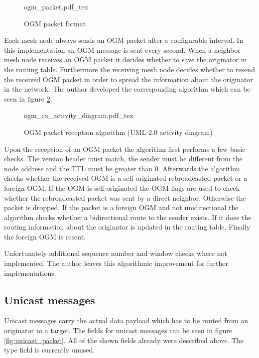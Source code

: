 \begin{figure}[H]
    \centering
    {ogm_packet.pdf_tex}
    \caption{OGM packet format}
    \label{fig:ogm}
\end{figure}

Each mesh node always sends an OGM packet after a configurable interval. In this implementation an OGM message is sent every second. When a neighbor mesh node receives an OGM packet it decides whether to save the originator in the routing table. Furthermore the receiving mesh node decides whether to resend the received OGM packet in order to spread the information about the originator in the network. The author developed the corresponding algorithm which can be seen in figure \ref{fig:ogm_rx}.

\begin{figure}[H]
    \centering
    \sffamily
    {ogm_rx_activity_diagram.pdf_tex}
    \rmfamily
    \caption{OGM packet reception algorithm (UML 2.0 activity diagram)}
    \label{fig:ogm_rx}
\end{figure}

Upon the reception of an OGM packet the algorithm first performs a few basic checks. The version header must match, the sender must be different from the node address and the TTL must be greater than 0. Afterwards the algorithm checks whether the received OGM is a self-originated rebroadcasted packet or a foreign OGM. If the OGM is self-originated the OGM flags are used to check whether the rebroadcasted packet was sent by a direct neighbor. Otherwise the packet is dropped. If the packet is a foreign OGM and not unidirectional the algorithm checks whether a bidirectional route to the sender exists. If it does the routing information about the originator is updated in the routing table. Finally the foreign OGM is resent.

Unfortunately additional sequence number and window checks where not implemented. The author leaves this algorithmic improvement for further implementations.

\subsection{Unicast messages}%
Unicast messages carry the actual data payload which has to be routed from an originator to a target. The fields for unicast messages can be seen in figure \ref{fig:unicast_packet}. All of the shown fields already were described above. The type field is currently unused.

